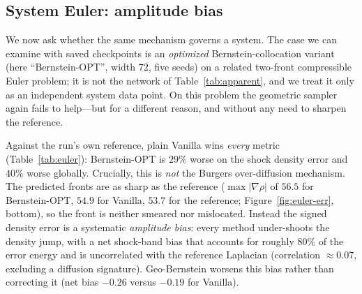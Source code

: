 \documentclass[11pt]{article}
\begin{document}
\subsection{System Euler: amplitude bias}\label{sec:mech-euler}
We now ask whether the same mechanism governs a system. The case we can examine
with saved checkpoints is an \emph{optimized} Bernstein-collocation variant
(here ``Bernstein-OPT'', width $72$, five seeds) on a related two-front
compressible Euler problem; it is not the network of Table~\ref{tab:apparent},
and we treat it only as an independent system data point. On this problem the
geometric sampler again fails to help---but for a different reason, and without
any need to sharpen the reference.

Against the run's own reference, plain Vanilla wins \emph{every} metric
(Table~\ref{tab:euler}): Bernstein-OPT is $29\%$ worse on the shock density error
and $40\%$ worse globally. Crucially, this is \emph{not} the Burgers
over-diffusion mechanism. The predicted fronts are as sharp as the reference
($\max|\nabla\rho|$ of $56.5$ for Bernstein-OPT, $54.9$ for Vanilla, $53.7$ for
the reference; Figure~\ref{fig:euler-err}, bottom), so the front is neither
smeared nor mislocated. Instead the signed density error is a systematic
\emph{amplitude bias}: every method under-shoots the density jump, with a net
shock-band bias that accounts for roughly $80\%$ of the error energy and is
uncorrelated with the reference Laplacian (correlation $\approx 0.07$, excluding a
diffusion signature). Geo-Bernstein worsens this bias rather than correcting it
(net bias $-0.26$ versus $-0.19$ for Vanilla).
\end{document}
